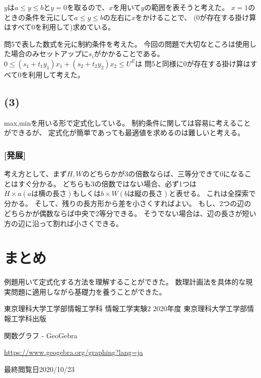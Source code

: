 \documentclass[12pt]{jarticle}
\begin{document}
$y$は$a \leq y \leq b$と$y=0$を取るので、$x$を用いて$y$の範囲を表そうと考えた。
$x=1$のときの条件を元にして$a \leq y \leq b$の左右に$x$をかけることで、
($0$が存在する掛け算はすべて$0$を利用して)求めている。

問5で表した数式を元に制約条件を考えた。
今回の問題で大切なところは使用した場合のみセットアップに$s_i$がかかることである。
$0 \leq (s_1+t_1y_1)x_1+(s_2+t_2y_2)x_2\leq U^E$は
問5と同様に$0$が存在する掛け算はすべて$0$を利用して考えた。

\clearpage

\subsection*{(3)}
max,minを用いる形で定式化している。
制約条件に関しては容易に考えることができるが、
定式化が簡単であっても最適値を求めるのは難しいと考える。

\subsubsection*{[発展]}
考え方として、まず$H,W$のどちらかが3の倍数ならば、三等分できて0になることはすぐ分かる。
どちらも3の倍数ではない場合、必ず1つは$H×a(aは横の長さ)$もしくは$b×W(bは縦の長さ)$と表せる。
これは全探索で分かる。
そして、残りの長方形から差を小さくすればよい。
もし、2つの辺のどちらかが偶数ならば中央で2等分できる。
そうでない場合は、辺の長さが短い方の辺に沿って割れば小さくできる。

\section{まとめ}
例題用いて定式化する方法を理解することができた。
数理計画法を具体的な現実問題に適用しながら基礎力を養うことができた。

\clearpage

\begin{thebibliography}{99}
    \label{sannkoubunnkenn_chapter}
    東京理科大学工学部情報工学科 情報工学実験2 2020年度
    東京理科大学工学部情報工学科出版

    関数グラフ - GeoGebra

    \url{https://www.geogebra.org/graphing?lang=ja}

    最終閲覧日2020/10/23

\end{thebibliography}


\clearpage
\end{document}
